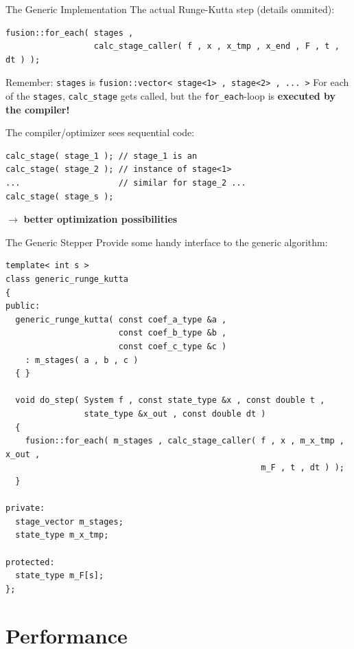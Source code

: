 \documentclass{beamer}
\begin{document}
\begin{frame}[fragile]{The Generic Implementation}
The actual Runge-Kutta step (details ommited):
\begin{lstlisting}[basicstyle=\ttfamily\tiny]
fusion::for_each( stages , 
                  calc_stage_caller( f , x , x_tmp , x_end , F , t , dt ) );
\end{lstlisting}
Remember: \lstinline+stages+ is \lstinline+fusion::vector< stage<1> , stage<2> , ... >+
For each of the \lstinline+stages+, \lstinline+calc_stage+ gets called, but the \lstinline+for_each+-loop is \textbf{executed by the compiler!}

\pause
\vspace{1em}
The compiler/optimizer sees sequential code:
\begin{lstlisting}
calc_stage( stage_1 ); // stage_1 is an 
calc_stage( stage_2 ); // instance of stage<1>
...                    // similar for stage_2 ...
calc_stage( stage_s );
\end{lstlisting}

$\longrightarrow$ \textbf{better optimization possibilities}

\end{frame}


\begin{frame}[fragile]{The Generic Stepper}
Provide some handy interface to the generic algorithm:
 \begin{lstlisting}[basicstyle=\ttfamily\tiny]
template< int s >
class generic_runge_kutta
{
public:
  generic_runge_kutta( const coef_a_type &a ,
                       const coef_b_type &b ,
                       const coef_c_type &c )
    : m_stages( a , b , c )
  { }

  void do_step( System f , const state_type &x , const double t , 
                state_type &x_out , const double dt )
  {
    fusion::for_each( m_stages , calc_stage_caller( f , x , m_x_tmp , x_out , 
                                                    m_F , t , dt ) );
  }

private:
  stage_vector m_stages;
  state_type m_x_tmp;

protected:
  state_type m_F[s];
};
\end{lstlisting}

\end{frame}


\section{Performance}
\end{document}
